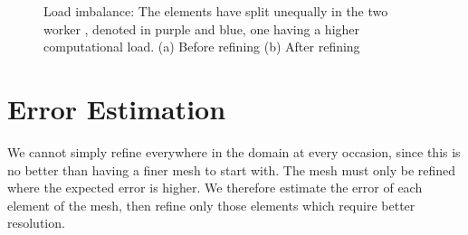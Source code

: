 \begin{figure}[H]
    \centering
    \hfill
    \caption{Load imbalance: The elements have split unequally in the two worker , denoted in purple and blue, one having a higher computational load. (a) Before refining (b) After refining}\label{fig:load_imbalance}
\end{figure}

\section{Error Estimation}\label{section:adaptive_mesh_refinement:error_estimation}

We cannot simply refine everywhere in the domain at every occasion, since this is no better than
having a finer mesh to start with. The mesh must only be refined where the expected error is higher.
We therefore estimate the error of each element of the mesh, then refine only those elements which
require better resolution.

